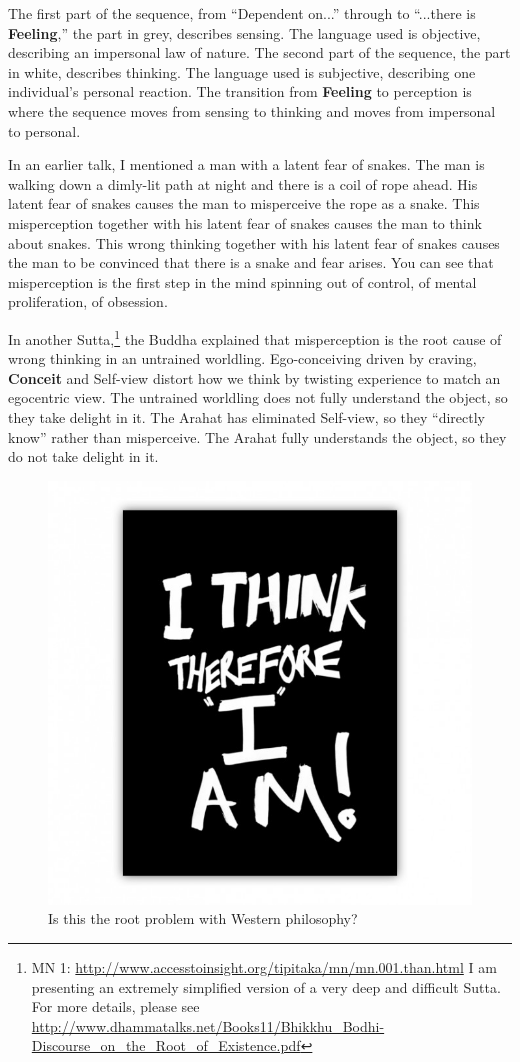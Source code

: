The first part of the sequence, from “Dependent on...” through to “...there is \textbf{Feeling},” the part in grey, describes sensing. The language used is objective, describing an impersonal law of nature. The second part of the sequence, the part in white, describes thinking. The language used is subjective, describing one individual’s personal reaction. The transition from \textbf{Feeling} to perception is where the sequence moves from sensing to thinking and moves from impersonal to personal.

In an earlier talk, I mentioned a man with a latent fear of snakes. The man is walking down a dimly-lit path at night and there is a coil of rope ahead. His latent fear of snakes causes the man to misperceive the rope as a snake. This misperception together with his latent fear of snakes causes the man to think about snakes. This wrong thinking together with his latent fear of snakes causes the man to be convinced that there is a snake and fear arises. You can see that misperception is the first step in the mind spinning out of control, of mental proliferation, of obsession.

In another Sutta,\footnote{MN 1: \url{http://www.accesstoinsight.org/tipitaka/mn/mn.001.than.html} I am presenting an extremely simplified version of a very deep and difficult Sutta. For more details, please see \url{http://www.dhammatalks.net/Books11/Bhikkhu_Bodhi-Discourse_on_the_Root_of_Existence.pdf}} the Buddha explained that misperception is the root cause of wrong thinking in an untrained worldling. Ego-conceiving driven by craving, \textbf{Conceit} and Self-view distort how we think by twisting experience to match an egocentric view. The untrained worldling does not fully understand the object, so they take delight in it. The Arahat has eliminated Self-view, so they “directly know” rather than misperceive. The Arahat fully understands the object, so they do not take delight in it.

\begin{figure}[h]
\centering
\includegraphics[width=0.3\linewidth]{./Diagrams/Think}
\caption{Is this the root problem with Western philosophy?}
\label{fig:Think}
\end{figure}

